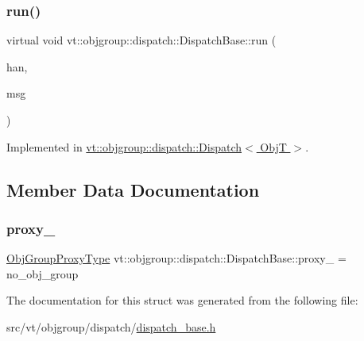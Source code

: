 \subsubsection{\texorpdfstring{run()}{run()}}
{\footnotesize\ttfamily virtual void vt\+::objgroup\+::dispatch\+::\+Dispatch\+Base\+::run (\begin{DoxyParamCaption}\item[{\hyperlink{namespacevt_af64846b57dfcaf104da3ef6967917573}{Handler\+Type}}]{han,  }\item[{\hyperlink{namespacevt_ac34f95a5e2b8109b55bfba52b074443d}{Base\+Message} $\ast$}]{msg }\end{DoxyParamCaption})\hspace{0.3cm}{\ttfamily [pure virtual]}}



Implemented in \hyperlink{structvt_1_1objgroup_1_1dispatch_1_1_dispatch_a9e6b35e9ff07fcc30c69b37fed60f770}{vt\+::objgroup\+::dispatch\+::\+Dispatch$<$ Obj\+T $>$}.



\subsection{Member Data Documentation}
\mbox{\label{structvt_1_1objgroup_1_1dispatch_1_1_dispatch_base_a4ae6b83696e76f6e7293e58262b608d5}} 
\subsubsection{\texorpdfstring{proxy\+\_\+}{proxy\_}}
{\footnotesize\ttfamily \hyperlink{namespacevt_ad7cae989df485fccca57f0792a880a8e}{Obj\+Group\+Proxy\+Type} vt\+::objgroup\+::dispatch\+::\+Dispatch\+Base\+::proxy\+\_\+ = no\+\_\+obj\+\_\+group\hspace{0.3cm}{\ttfamily [private]}}



The documentation for this struct was generated from the following file\+:\begin{DoxyCompactItemize}
\item 
src/vt/objgroup/dispatch/\hyperlink{dispatch__base_8h}{dispatch\+\_\+base.\+h}\end{DoxyCompactItemize}
